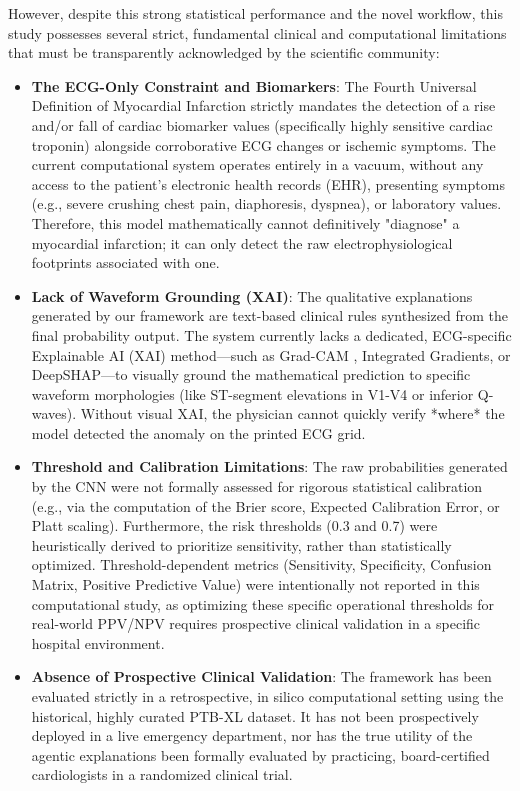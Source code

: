 \documentclass[10pt,twocolumn,letterpaper]{article}
\begin{document}
However, despite this strong statistical performance and the novel workflow, this study possesses several strict, fundamental clinical and computational limitations that must be transparently acknowledged by the scientific community:

\begin{itemize}
    \item \textbf{The ECG-Only Constraint and Biomarkers}: The Fourth Universal Definition of Myocardial Infarction \cite{thygesen2018fourth} strictly mandates the detection of a rise and/or fall of cardiac biomarker values (specifically highly sensitive cardiac troponin) alongside corroborative ECG changes or ischemic symptoms. The current computational system operates entirely in a vacuum, without any access to the patient's electronic health records (EHR), presenting symptoms (e.g., severe crushing chest pain, diaphoresis, dyspnea), or laboratory values. Therefore, this model mathematically cannot definitively "diagnose" a myocardial infarction; it can only detect the raw electrophysiological footprints associated with one.
    \item \textbf{Lack of Waveform Grounding (XAI)}: The qualitative explanations generated by our framework are text-based clinical rules synthesized from the final probability output. The system currently lacks a dedicated, ECG-specific Explainable AI (XAI) method—such as Grad-CAM \cite{selvaraju2017grad}, Integrated Gradients, or DeepSHAP—to visually ground the mathematical prediction to specific waveform morphologies (like ST-segment elevations in V1-V4 or inferior Q-waves). Without visual XAI, the physician cannot quickly verify *where* the model detected the anomaly on the printed ECG grid.
    \item \textbf{Threshold and Calibration Limitations}: The raw probabilities generated by the CNN were not formally assessed for rigorous statistical calibration (e.g., via the computation of the Brier score, Expected Calibration Error, or Platt scaling). Furthermore, the risk thresholds (0.3 and 0.7) were heuristically derived to prioritize sensitivity, rather than statistically optimized. Threshold-dependent metrics (Sensitivity, Specificity, Confusion Matrix, Positive Predictive Value) were intentionally not reported in this computational study, as optimizing these specific operational thresholds for real-world PPV/NPV requires prospective clinical validation in a specific hospital environment.
    \item \textbf{Absence of Prospective Clinical Validation}: The framework has been evaluated strictly in a retrospective, in silico computational setting using the historical, highly curated PTB-XL dataset. It has not been prospectively deployed in a live emergency department, nor has the true utility of the agentic explanations been formally evaluated by practicing, board-certified cardiologists in a randomized clinical trial.

\end{itemize}
\end{document}
